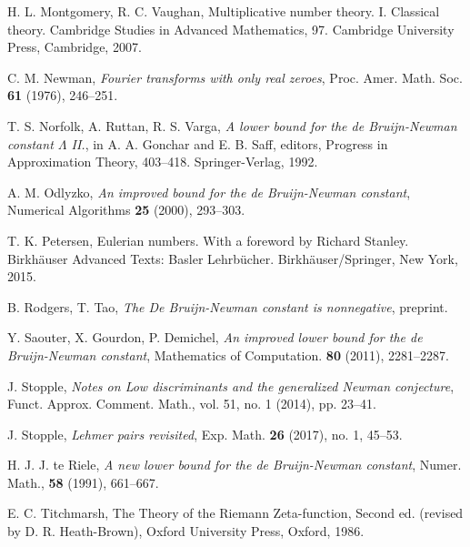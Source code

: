 \documentclass[a4paper,11pt,twoside]{amsart}
\begin{document}
\begin{thebibliography}{99}
H. L. Montgomery, R. C. Vaughan, Multiplicative number theory. I. Classical theory. Cambridge Studies in Advanced Mathematics, 97. Cambridge University Press, Cambridge, 2007.

C. M. Newman, \emph{Fourier transforms with only real zeroes}, Proc. Amer. Math. Soc. \textbf{61} (1976), 246--251.

T. S. Norfolk, A. Ruttan, R. S. Varga, \emph{A lower bound for the de Bruijn-Newman
constant $\Lambda$ II.}, in A. A. Gonchar and E. B. Saff, editors, Progress in Approximation
Theory, 403--418. Springer-Verlag, 1992.

A. M. Odlyzko, \emph{An improved bound for the de Bruijn-Newman constant}, Numerical Algorithms \textbf{25} (2000), 293--303.

T. K. Petersen, Eulerian numbers.  With a foreword by Richard Stanley. Birkh\"auser Advanced Texts: Basler Lehrb\"ucher. Birkh\"auser/Springer, New York, 2015.

B. Rodgers, T. Tao, \emph{The De Bruijn-Newman constant is nonnegative}, preprint.

Y. Saouter, X. Gourdon, P. Demichel, \emph{An improved lower bound for the de Bruijn-Newman constant}, Mathematics of Computation. \textbf{80} (2011), 2281--2287. 

J. Stopple, \emph{Notes on Low discriminants and the generalized Newman conjecture}, Funct. Approx. Comment.
Math., vol. 51, no. 1 (2014), pp. 23--41.

J. Stopple, \emph{Lehmer pairs revisited}, Exp. Math. \textbf{26} (2017), no. 1, 45--53. 

H. J. J. te Riele, \emph{A new lower bound for the de Bruijn-Newman constant}, Numer. Math., \textbf{58} (1991), 661--667.

E. C. Titchmarsh, The Theory of the Riemann Zeta-function, Second ed. (revised by D. R. Heath-Brown), Oxford University Press, Oxford, 1986.	


\end{thebibliography} 
\end{document}

